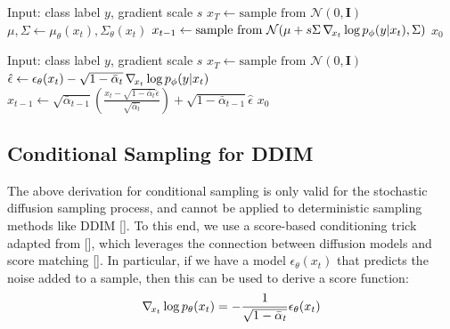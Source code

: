 \documentclass{article}
\newcommand{\shortcite}[1]{[\citenum{#1}]}
\newcommand{\namecite}[1]{\citeauthor{#1} [\citenum{#1}]}
\begin{document}
\begin{algorithm}[t]
    \caption{Classifier guided diffusion sampling, given a diffusion model $(\mu_{\theta}(x_t), \Sigma_{\theta}(x_t))$, classifier $p_{\phi}(y|x_t)$, and gradient scale $s$.}
    \label{alg:guiding}
    \begin{algorithmic}
        \STATE Input: class label $y$, gradient scale $s$
        \STATE $x_T \gets \text{sample from } \mathcal{N}(0, \mathbf{I})$
            \STATE $\mu, \Sigma \gets \mu_{\theta}(x_t), \Sigma_{\theta}(x_t)$
            \STATE $x_{t-1} \gets \text{sample from } \mathcal{N}(\mu + s \Sigma \grad_{x_t} \log p_{\phi}(y|x_t), \Sigma)$
        \ENDFOR
        \RETURN $x_0$
    \end{algorithmic}
\end{algorithm}

\begin{algorithm}[t]
    \caption{Classifier guided DDIM sampling, given a diffusion model $\epsilon_{\theta}(x_t)$, classifier $p_{\phi}(y|x_t)$, and gradient scale $s$.}
    \label{alg:guidingddim}
    \begin{algorithmic}
        \STATE Input: class label $y$, gradient scale $s$
        \STATE $x_T \gets \text{sample from } \mathcal{N}(0, \mathbf{I})$
            \STATE $\hat \epsilon \gets \epsilon_{\theta}(x_t) - \sqrt{1-\bar{\alpha}_t} \grad_{x_t} \log p_{\phi}(y|x_t)$
            \STATE $x_{t-1} \gets \sqrt{\bar{\alpha}_{t-1}} \left( \frac{x_t - \sqrt{1-\bar{\alpha}_t} \hat{\epsilon}}{\sqrt{\bar{\alpha}_t}} \right) + \sqrt{1-\bar{\alpha}_{t-1}} \hat{\epsilon}$
        \ENDFOR
        \RETURN $x_0$
    \end{algorithmic}
\end{algorithm}

\subsection{Conditional Sampling for DDIM}
\label{sec:ddimguide}

The above derivation for conditional sampling is only valid for the stochastic diffusion sampling process, and cannot be applied to deterministic sampling methods like DDIM \shortcite{ddim}. To this end, we use a score-based conditioning trick adapted from \namecite{sde}, which leverages the connection between diffusion models and score matching \shortcite{scorematching}. In particular, if we have a model $\epsilon_{\theta}(x_t)$ that predicts the noise added to a sample, then this can be used to derive a score function:
%
\begin{alignat}{1}\grad_{x_t} \log p_{\theta}(x_t) = -\frac{1}{\sqrt{1-\bar{\alpha}_t}} \epsilon_{\theta}(x_t)
\end{alignat}
\end{document}
